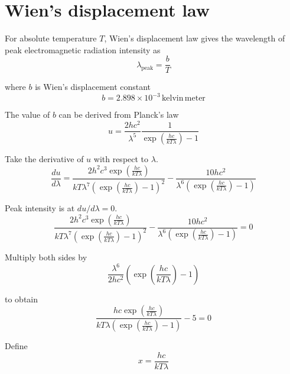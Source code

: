 

\section*{Wien's displacement law}

For absolute temperature $T$,
Wien's displacement law gives the wavelength
of peak electromagnetic radiation intensity as
\begin{equation*}
\lambda_\text{peak}=\frac{b}{T}
\end{equation*}

where $b$ is Wien's displacement constant
\begin{equation*}
b=2.898\times10^{-3}\,\text{kelvin}\,\text{meter}
\end{equation*}

The value of $b$ can be derived from Planck's law
\begin{equation*}
u=\frac{2hc^2}{\lambda^5}\frac{1}{\exp\left(\frac{hc}{kT\lambda}\right)-1}
\end{equation*}

Take the derivative of $u$ with respect to $\lambda$.
\begin{equation*}
\frac{du}{d\lambda}
=\frac{2h^2c^3\exp\left(\frac{hc}{kT\lambda}\right)}
{kT\lambda^7\left(\exp\left(\frac{hc}{kT\lambda}\right)-1\right)^2}
-\frac{10hc^2}{\lambda^6\left(\exp\left(\frac{hc}{kT\lambda}\right)-1\right)}
\end{equation*}

Peak intensity is at $du/d\lambda=0$.
\begin{equation*}
\frac{2h^2c^3\exp\left(\frac{hc}{kT\lambda}\right)}
{kT\lambda^7\left(\exp\left(\frac{hc}{kT\lambda}\right)-1\right)^2}
-\frac{10hc^2}{\lambda^6\left(\exp\left(\frac{hc}{kT\lambda}\right)-1\right)}=0
\end{equation*}

Multiply both sides by
\begin{equation*}
\frac{\lambda^6}{2hc^2}\left(\exp\left(\frac{hc}{kT\lambda}\right)-1\right)
\end{equation*}

to obtain
\begin{equation*}
\frac{hc\exp\left(\frac{hc}{kT\lambda}\right)}
{kT\lambda\left(\exp\left(\frac{hc}{kT\lambda}\right)-1\right)}-5=0
\end{equation*}

Define
\begin{equation*}
x=\frac{hc}{kT\lambda}
\end{equation*}

